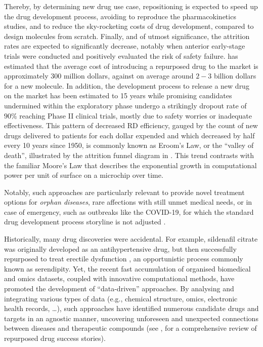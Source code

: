 Thereby, by determining new drug use case, repositioning is expected to speed up the drug development process, avoiding to reproduce the pharmacokinetics studies, and to reduce the sky-rocketing costs of drug development, compared to design molecules from scratch. Finally, and of utmost significance, the attrition rates are expected to significantly decrease, notably when anterior early-stage trials were conducted and positively evaluated the risk of safety failure. \autocite{nosengo16} has estimated that the average cost of introducing a repurposed drug to the market is approximately $300$ million dollars, against on average around $2-3$ billion dollars for a new molecule. In addition, the development process to release a new drug on the market has been estimated to 15 years while promising candidates undermined within the exploratory phase undergo a strikingly dropout rate of $90\%$ reaching Phase II clinical trials, mostly due to safety worries or inadequate effectiveness. This pattern of decreased \acrshort{RD} efficiency, gauged by the count of new drugs delivered to patients for each dollar expended and which decreased by half every 10 years since 1950, is commonly known as Eroom's Law, or the \enquote{valley of death}, illustrated by the attrition funnel diagram in . This trend contrasts with the familiar Moore's Law that describes the exponential growth in computational power per unit of surface on a microchip over time.

Notably, such approaches are particularly relevant to provide novel treatment options for \emph{orphan diseases}, rare affections with still unmet medical needs, or in case of emergency, such as outbreaks like the COVID-19, for which the standard drug development process storyline is not adjusted .


Historically, many drug discoveries were accidental. For example, sildenafil citrate was originally developed as an antihypertensive drug, but then successfully repurposed to treat erectile dysfunction \autocite{ycharts}, an opportunistic process commonly known as \gls{serendipity}.
Yet, the recent fast accumulation of organised biomedical and omics datasets, coupled with innovative computational methods, have promoted the development of \enquote{data-driven} approaches. By analysing and integrating various types of data (e.g., chemical structure, omics, electronic health records, \ldots), such approaches have identified numerous candidate drugs and targets in an agnostic manner, uncovering unforeseen and unexpected connections between diseases and therapeutic compounds (see \autocite[Table 1 and Box 1]{pushpakom_etal19}, for a comprehensive review of repurposed drug success stories). 


